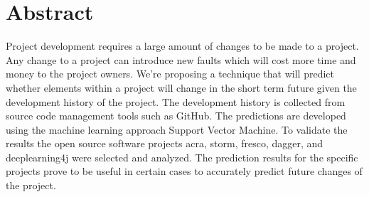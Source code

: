 \chapter*{Abstract}

Project development requires a large amount of changes to be made to a project. Any change to a project can introduce new faults which will cost more time and money to the project owners. We're proposing a technique that will predict whether elements within a project will change in the short term future given the development history of the project. The development history is collected from source code management tools such as GitHub. The predictions are developed using the machine learning approach Support Vector Machine. To validate the results the open source software projects acra, storm, fresco, dagger, and deeplearning4j were selected and analyzed. The prediction results for the specific projects prove to be useful in certain cases to accurately predict future changes of the project.

